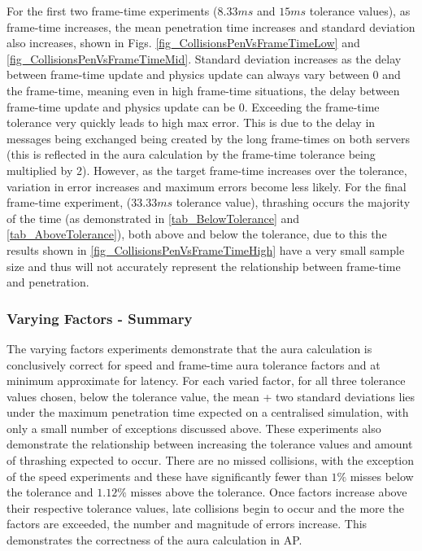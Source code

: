 For the first two frame-time experiments ($8.33ms$ and $15ms$ tolerance values), as frame-time increases, the mean penetration time increases and standard deviation also increases, shown in Figs. \ref{fig_CollisionsPenVsFrameTimeLow} and \ref{fig_CollisionsPenVsFrameTimeMid}. Standard deviation increases as the delay between frame-time update and physics update can always vary between 0 and the frame-time, meaning even in high frame-time situations, the delay between frame-time update and physics update can be 0. Exceeding the frame-time tolerance very quickly leads to high max error. This is due to the delay in messages being exchanged being created by the long frame-times on both servers (this is reflected in the aura calculation by the frame-time tolerance being multiplied by 2). However, as the target frame-time increases over the tolerance, variation in error increases and maximum errors become less likely. For the final frame-time experiment, ($33.33ms$ tolerance value), thrashing occurs the majority of the time (as demonstrated in \ref{tab_BelowTolerance} and \ref{tab_AboveTolerance}), both above and below the tolerance, due to this the results shown in \ref{fig_CollisionsPenVsFrameTimeHigh} have a very small sample size and thus will not accurately represent the relationship between frame-time and penetration.

\subsubsection{Varying Factors - Summary}
The varying factors experiments demonstrate that the aura calculation is conclusively correct for speed and frame-time aura tolerance factors and at minimum approximate for latency. For each varied factor, for all three tolerance values chosen, below the tolerance value, the mean + two standard deviations lies under the maximum penetration time expected on a centralised simulation, with only a small number of exceptions discussed above. These experiments also demonstrate the relationship between increasing the tolerance values and amount of thrashing expected to occur. There are no missed collisions, with the exception of the speed experiments and these have significantly fewer than $1\%$ misses below the tolerance and $1.12\%$ misses above the tolerance. Once factors increase above their respective tolerance values, late collisions begin to occur and the more the factors are exceeded, the number and magnitude of errors increase. This demonstrates the correctness of the aura calculation in AP.

